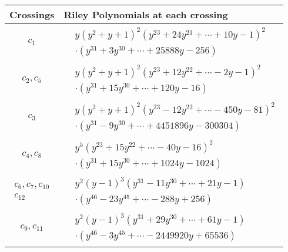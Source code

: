 \documentclass[1p]{elsarticle_modified}
\theoremstyle{definition}
\begin{document}
\begin{tabular}{m{50pt}|m{274pt}}
Crossings & \hspace{64pt}Riley Polynomials at each crossing \\
\hline $$\begin{aligned}c_{1}\end{aligned}$$&$\begin{aligned}
&y(y^2+y+1)^2(y^{23}+24 y^{21}+\cdots+10 y-1)^{2}\\
&\cdot(y^{31}+3 y^{30}+\cdots+25888 y-256)
\end{aligned}$\\
\hline $$\begin{aligned}c_{2},c_{5}\end{aligned}$$&$\begin{aligned}
&y(y^2+y+1)^2(y^{23}+12 y^{22}+\cdots-2 y-1)^{2}\\
&\cdot(y^{31}+15 y^{30}+\cdots+120 y-16)
\end{aligned}$\\
\hline $$\begin{aligned}c_{3}\end{aligned}$$&$\begin{aligned}
&y(y^2+y+1)^2(y^{23}-12 y^{22}+\cdots-450 y-81)^{2}\\
&\cdot(y^{31}-9 y^{30}+\cdots+4451896 y-300304)
\end{aligned}$\\
\hline $$\begin{aligned}c_{4},c_{8}\end{aligned}$$&$\begin{aligned}
&y^5(y^{23}+15 y^{22}+\cdots-40 y-16)^{2}\\
&\cdot(y^{31}+15 y^{30}+\cdots+1024 y-1024)
\end{aligned}$\\
\hline $$\begin{aligned}c_{6},c_{7},c_{10}\\c_{12}\end{aligned}$$&$\begin{aligned}
&y^2(y-1)^3(y^{31}-11 y^{30}+\cdots+21 y-1)\\
&\cdot(y^{46}-23 y^{45}+\cdots-288 y+256)
\end{aligned}$\\
\hline $$\begin{aligned}c_{9},c_{11}\end{aligned}$$&$\begin{aligned}
&y^2(y-1)^3(y^{31}+29 y^{30}+\cdots+61 y-1)\\
&\cdot(y^{46}-3 y^{45}+\cdots-2449920 y+65536)
\end{aligned}$\\
\hline
\end{tabular}
\vskip 2pc
\end{document}
